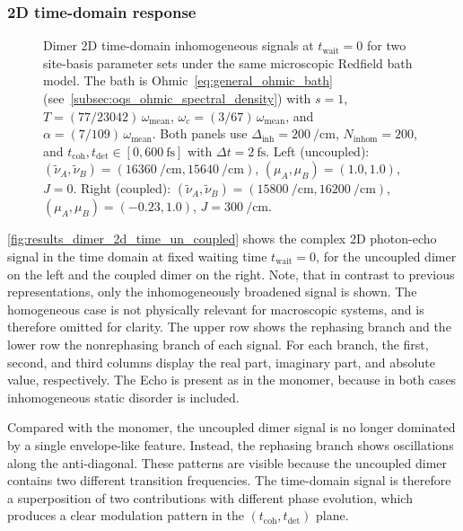 \subsubsection{2D time-domain response}
\begin{figure}[htbp]
    \centering
    \caption{Dimer 2D time-domain inhomogeneous signals at $t_{\mathrm{wait}}=0$ for two site-basis parameter sets under the same microscopic Redfield bath model. The bath is Ohmic~\autoref{eq:general_ohmic_bath} (see~\autoref{subsec:oqs_ohmic_spectral_density}) with $s=1$, $T=(77/23042)\,\omega_{\mathrm{mean}}$, $\omega_c=(3/67)\,\omega_{\mathrm{mean}}$, and $\alpha=(7/109)\,\omega_{\mathrm{mean}}$. Both panels use $\Delta_{\mathrm{inh}}=\SI{200}{\per\centi\metre}$, $N_{\mathrm{inhom}}=200$, and $t_{\mathrm{coh}},t_{\mathrm{det}}\in[0,\SI{600}{\femto\second}]$ with $\Delta t=\SI{2}{\femto\second}$. Left (uncoupled): $(\tilde{\nu}_A,\tilde{\nu}_B)=(\SI{16360}{\per\centi\metre},\SI{15640}{\per\centi\metre})$, $(\mu_A,\mu_B)=(1.0,1.0)$, $J=0$. Right (coupled): $(\tilde{\nu}_A,\tilde{\nu}_B)=(\SI{15800}{\per\centi\metre},\SI{16200}{\per\centi\metre})$, $(\mu_A,\mu_B)=(-0.23,1.0)$, $J=\SI{300}{\per\centi\metre}$.}
    \label{fig:results_dimer_2d_time_un_coupled}
\end{figure}

\autoref{fig:results_dimer_2d_time_un_coupled} shows the complex 2D photon-echo signal in the time domain at fixed waiting time $t_{\mathrm{wait}}=0$, for the uncoupled dimer on the left and the coupled dimer on the right. Note, that in contrast to previous representations, only the inhomogeneously broadened signal is shown. The homogeneous case is not physically relevant for macroscopic systems, and is therefore omitted for clarity. The upper row shows the rephasing branch and the lower row the nonrephasing branch of each signal. For each branch, the first, second, and third columns display the real part, imaginary part, and absolute value, respectively. The Echo is present as in the monomer, because in both cases inhomogeneous static disorder is included.

Compared with the monomer, the uncoupled dimer signal is no longer dominated by a single envelope-like feature. Instead, the rephasing branch shows oscillations along the anti-diagonal. These patterns are visible because the uncoupled dimer contains two different transition frequencies. The time-domain signal is therefore a superposition of two contributions with different phase evolution, which produces a clear modulation pattern in the $(t_{\mathrm{coh}},t_{\mathrm{det}})$ plane. 


